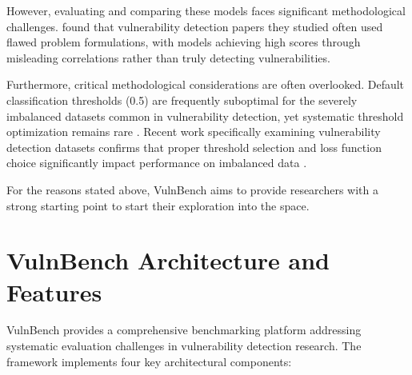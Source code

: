 \documentclass[letterpaper]{article}
\begin{document}
However, evaluating and comparing these models faces significant methodological challenges. \cite{risse2025top} found that vulnerability detection papers they studied often used flawed problem formulations, with models achieving high scores through misleading correlations rather than truly detecting vulnerabilities.

Furthermore, critical methodological considerations are often overlooked. Default classification thresholds (0.5) are frequently suboptimal for the severely imbalanced datasets common in vulnerability detection, yet systematic threshold optimization remains rare \citep{ghost2021, leevy2023optimal}. Recent work specifically examining vulnerability detection datasets confirms that proper threshold selection and loss function choice significantly impact performance on imbalanced data \citep{he2025imbalance}.

For the reasons stated above, VulnBench aims to provide researchers with a strong starting point to start their exploration into the space.

\section{VulnBench Architecture and Features}

VulnBench provides a comprehensive benchmarking platform addressing systematic evaluation challenges in vulnerability detection research. The framework implements four key architectural components:
\end{document}
